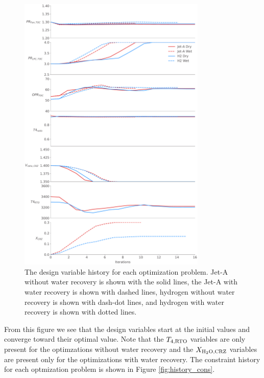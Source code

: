 \documentclass[conf]{new-aiaa}
\begin{document}
\begin{figure}[hbt!]
    \centering
    \includegraphics[width=0.8\textwidth]{dvs.pdf}
    \caption{The design variable history for each optimization problem.
        Jet-A without water recovery is shown with the solid lines, the Jet-A with water recovery is shown with dashed lines, hydrogen without water recovery is shown with dash-dot lines, and hydrogen with water recovery is shown with dotted lines.}
    \label{fig:history_dvs}
\end{figure}

From this figure we see that the design variables start at the initial values and converge toward their optimal value.
Note that the $T_{4,\rm{RTO}}$ variables are only present for the optimzations without water recovery and the $X_{\rm{{H_2O},CRZ}}$ variables are present only for the optimizations with water recovery.
The constraint history for each optmization problem is shown in Figure \ref{fig:history_cons}.
\end{document}
